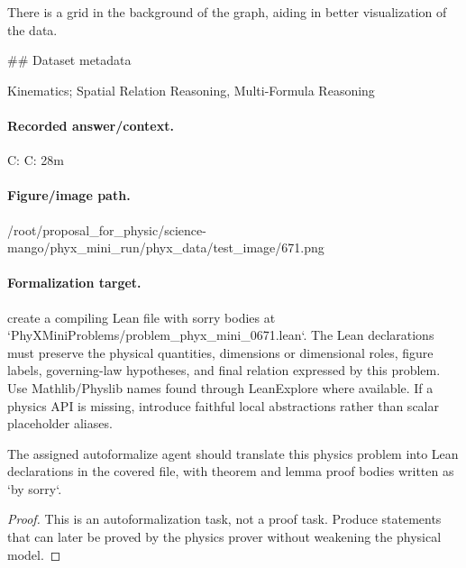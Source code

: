 There is a grid in the background of the graph, aiding in better visualization of the data.

\#\# Dataset metadata

Kinematics; Spatial Relation Reasoning, Multi-Formula Reasoning

\paragraph{Recorded answer/context.}
C: C: 28m

\paragraph{Figure/image path.}
/root/proposal\_for\_physic/science-mango/phyx\_mini\_run/phyx\_data/test\_image/671.png

\paragraph{Formalization target.}
create a compiling Lean file with sorry bodies at `PhyXMiniProblems/problem\_phyx\_mini\_0671.lean`. The Lean declarations must preserve the physical quantities, dimensions or dimensional roles, figure labels, governing-law hypotheses, and final relation expressed by this problem.
Use Mathlib/Physlib names found through LeanExplore where available. If a physics API is missing, introduce faithful local abstractions rather than scalar placeholder aliases.

\begin{theorem}
\label{thm:physics:phyx_mini_0671:target}
The assigned autoformalize agent should translate this physics problem into Lean declarations in the covered file, with theorem and lemma proof bodies written as `by sorry`.
\end{theorem}
\begin{proof}
This is an autoformalization task, not a proof task. Produce statements that can later be proved by the physics prover without weakening the physical model.
\end{proof}

